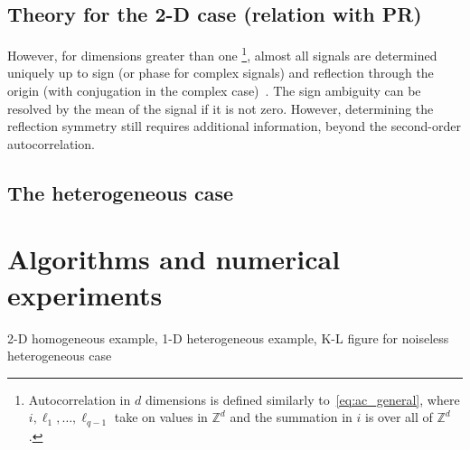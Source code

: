 \documentclass[12pt]{article}
\newcommand{\1}{\mathbf{1}}
\theoremstyle{plain}
\theoremstyle{definition}
\theoremstyle{remark}
\theoremstyle{plain}
\theoremstyle{remark}
\theoremstyle{plain}
\theoremstyle{plain}
\begin{document}
\subsection{Theory for the 2-D case (relation with PR)}

However, for dimensions greater than one \footnote{Autocorrelation in $d$ dimensions is defined similarly to~\eqref{eq:ac_general}, where $ i, \ell_1, \ldots, \ell_{q-1}$ take on values in $\mathbb{Z}^d$ and the summation in $i$ is over all of $\mathbb{Z}^d$.}, almost all signals are determined uniquely up to sign (or phase for complex signals) and reflection through the origin (with conjugation in the complex case)~\cite{hayes1982reconstruction}. 
The sign ambiguity can be resolved by the mean of the signal if it is not zero. However, determining the reflection symmetry still requires additional information, beyond the second-order autocorrelation.


\subsection{The heterogeneous case}

%
%

\section{Algorithms and numerical experiments}

2-D homogeneous example, 1-D heterogeneous example, K-L figure for noiseless heterogeneous case
\end{document}
